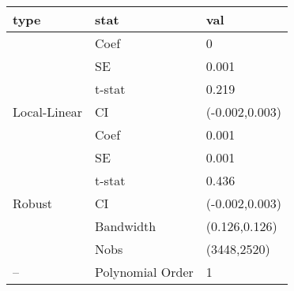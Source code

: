 
\begin{tabular}{lll}
\toprule
type & stat & val\\
\midrule
 & Coef & 0\\

 & SE & 0.001\\

 & t-stat & 0.219\\

\multirow{-4}{*}{\raggedright\arraybackslash Local-Linear} & CI & (-0.002,0.003)\\
\cmidrule{1-3}
 & Coef & 0.001\\

 & SE & 0.001\\

 & t-stat & 0.436\\

\multirow{-4}{*}{\raggedright\arraybackslash Robust} & CI & (-0.002,0.003)\\
\cmidrule{1-3}
 & Bandwidth & (0.126,0.126)\\

 & Nobs & (3448,2520)\\

\multirow{-3}{*}{\raggedright\arraybackslash --} & Polynomial Order & 1\\
\bottomrule
\end{tabular}